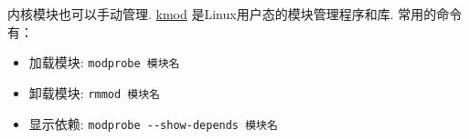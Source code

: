 \begin{notebox}
	内核模块也可以手动管理.
	\href{https://git.kernel.org/pub/scm/utils/kernel/kmod/kmod.git}{kmod} 是Linux用户态的模块管理程序和库.
	常用的命令有：
	\begin{itemize}
		\item 加载模块: \lstinline{modprobe 模块名}
		\item 卸载模块: \lstinline{rmmod 模块名}
		\item 显示依赖: \lstinline{modprobe --show-depends 模块名}
	\end{itemize}
\end{notebox}
